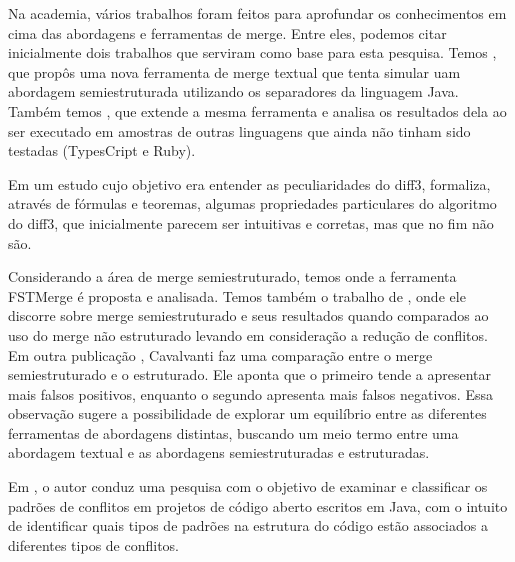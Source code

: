 Na academia, vários trabalhos foram feitos para aprofundar os conhecimentos em cima das abordagens e
ferramentas de merge. Entre eles, podemos citar inicialmente dois trabalhos que serviram como base para esta pesquisa.
Temos \citeauthor{clem21}, que propôs uma nova ferramenta de merge textual que tenta simular uam abordagem semiestruturada
utilizando os separadores da linguagem Java. Também temos \citeauthor{heitor21}, que extende a mesma ferramenta e analisa os
resultados dela ao ser executado em amostras de outras linguagens que ainda não tinham sido testadas (TypesCript e Ruby).

Em um estudo cujo objetivo era entender as peculiaridades do diff3, \citeauthor{khan07} formaliza, através de fórmulas e teoremas,
algumas propriedades particulares do algoritmo do diff3, que inicialmente parecem ser intuitivas e corretas, mas que no fim não
são.

Considerando a área de merge semiestruturado, temos \cite{apel11} onde a ferramenta FSTMerge é proposta e analisada. Temos
também o trabalho de \citeauthor{cavalcanti17}, onde ele
discorre sobre merge semiestruturado e seus resultados quando comparados ao uso do merge não
estruturado levando em consideração a redução de conflitos.
Em outra publicação \cite{cavalcanti19}, Cavalvanti faz uma comparação entre o merge semiestruturado e o estruturado.
Ele aponta que o primeiro tende a apresentar mais falsos positivos, enquanto o segundo apresenta mais falsos negativos.
Essa observação sugere a possibilidade de explorar um equilíbrio entre as diferentes ferramentas de abordagens
distintas, buscando um meio termo entre uma abordagem textual e as abordagens
semiestruturadas e estruturadas.

Em \citeauthor{accioly18}, o autor conduz uma pesquisa com o objetivo de examinar e classificar os
padrões de conflitos em projetos de código aberto escritos em Java,
com o intuito de identificar quais tipos de padrões na estrutura do
código estão associados a diferentes tipos de conflitos.

